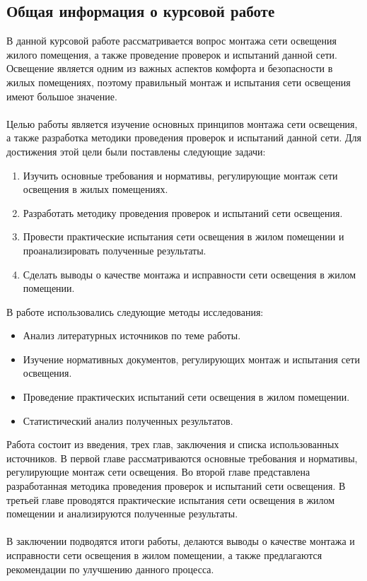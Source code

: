 \documentclass{article}
\begin{document}
\subsection{Общая информация о курсовой работе}
В данной курсовой работе рассматривается вопрос монтажа сети освещения жилого помещения, а также проведение проверок и испытаний данной сети. Освещение является одним из важных аспектов комфорта и безопасности в жилых помещениях, поэтому правильный монтаж и испытания сети освещения имеют большое значение.\\
~\\
Целью работы является изучение основных принципов монтажа сети освещения, а также разработка методики проведения проверок и испытаний данной сети. Для достижения этой цели были поставлены следующие задачи:
\begin{enumerate}
\item Изучить основные требования и нормативы, регулирующие монтаж сети освещения в жилых помещениях.
\item Разработать методику проведения проверок и испытаний сети освещения.
\item Провести практические испытания сети освещения в жилом помещении и проанализировать полученные результаты.
\item Сделать выводы о качестве монтажа и исправности сети освещения в жилом помещении.
\end{enumerate}
В работе использовались следующие методы исследования:
\begin{itemize}
\item Анализ литературных источников по теме работы.
\item Изучение нормативных документов, регулирующих монтаж и испытания сети освещения.
\item Проведение практических испытаний сети освещения в жилом помещении.
\item Статистический анализ полученных результатов.
\end{itemize}
Работа состоит из введения, трех глав, заключения и списка использованных источников. В первой главе рассматриваются основные требования и нормативы, регулирующие монтаж сети освещения. Во второй главе представлена разработанная методика проведения проверок и испытаний сети освещения. В третьей главе проводятся практические испытания сети освещения в жилом помещении и анализируются полученные результаты.\\
~\\
В заключении подводятся итоги работы, делаются выводы о качестве монтажа и исправности сети освещения в жилом помещении, а также предлагаются рекомендации по улучшению данного процесса.
\end{document}
